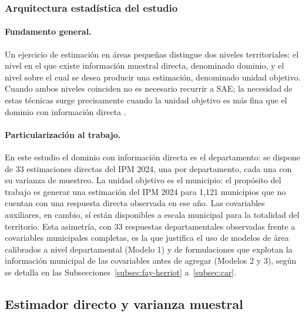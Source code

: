 \subsubsection{Arquitectura estadística del estudio}

\paragraph{Fundamento general.}
Un ejercicio de estimación en áreas pequeñas distingue dos niveles territoriales: el nivel en el que existe información muestral directa, denominado dominio, y el nivel sobre el cual se desea producir una estimación, denominado unidad objetivo. Cuando ambos niveles coinciden no es necesario recurrir a SAE; la necesidad de estas técnicas surge precisamente cuando la unidad objetivo es más fina que el dominio con información directa \cite{RaoMolina_2015}.

\paragraph{Particularización al trabajo.}
En este estudio el dominio con información directa es el departamento: se dispone de 33 estimaciones directas del IPM 2024, una por departamento, cada una con su varianza de muestreo. La unidad objetivo es el municipio: el propósito del trabajo es generar una estimación del IPM 2024 para 1{,}121 municipios que no cuentan con una respuesta directa observada en ese año. Las covariables auxiliares, en cambio, sí están disponibles a escala municipal para la totalidad del territorio. Esta asimetría, con 33 respuestas departamentales observadas frente a covariables municipales completas, es la que justifica el uso de modelos de área calibrados a nivel departamental (Modelo 1) y de formulaciones que explotan la información municipal de las covariables antes de agregar (Modelos 2 y 3), según se detalla en las Subsecciones~\ref{subsec:fay-herriot} a~\ref{subsec:car}.


\subsection{Estimador directo y varianza muestral}
\label{subsec:estimadores-directos}

